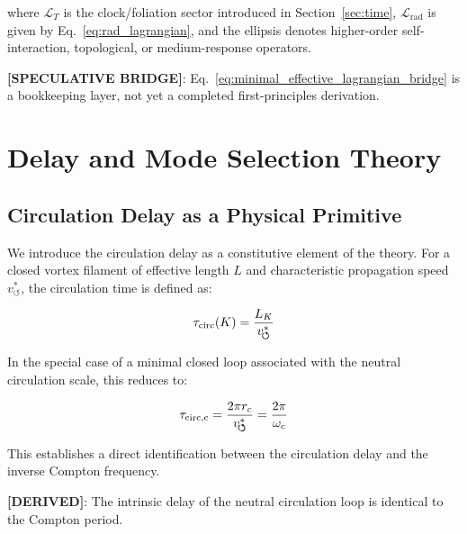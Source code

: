 \documentclass[11pt]{article}
\theoremstyle{definition}
\theoremstyle{plain}
\theoremstyle{remark}
\newcommand{\rc}{{r_c}}
\newcommand{\vchar}{v_{\!\boldsymbol{\circlearrowleft}}^{\ast}}
\begin{document}
        where $\mathcal{L}_{T}$ is the clock/foliation sector introduced in Section~\ref{sec:time}, $\mathcal{L}_{\mathrm{rad}}$ is given by Eq.~\eqref{eq:rad_lagrangian}, and the ellipsis denotes higher-order self-interaction, topological, or medium-response operators.

        \textbf{[SPECULATIVE BRIDGE]}: Eq.~\eqref{eq:minimal_effective_lagrangian_bridge} is a bookkeeping layer, not yet a completed first-principles derivation.

        
\section{Delay and Mode Selection Theory}
    \label{sec:delay}
    
    \subsection{Circulation Delay as a Physical Primitive}
        
        We introduce the circulation delay as a constitutive element of the theory.
        For a closed vortex filament of effective length $L$ and characteristic propagation speed $\vchar$, the circulation time is defined as:
        
        \begin{align}
            \tau_{\rm circ}(K) = \frac{L_K}{\vchar}
            \label{eq:delay_time}
        \end{align}
        
        In the special case of a minimal closed loop associated with the neutral circulation scale, this reduces to:
        
        \begin{align}
            \tau_{\rm circ,c} = \frac{2\pi \rc}{\vchar} = \frac{2\pi}{\omega_c}
            \label{eq:compton_delay}
        \end{align}
        
        This establishes a direct identification between the circulation delay and the inverse Compton frequency.
        
        \textbf{[DERIVED]}: The intrinsic delay of the neutral circulation loop is identical to the Compton period.
    
\end{document}

